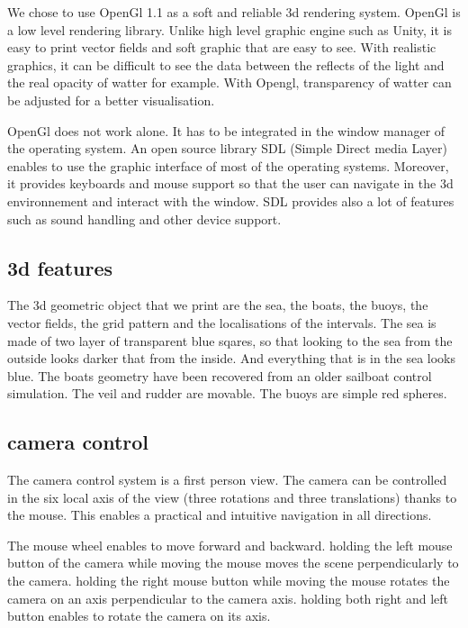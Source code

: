 \documentclass[a4paper]{report}
\begin{document}
We chose to use OpenGl 1.1 as a soft and reliable 3d rendering system. OpenGl is a low level rendering library. Unlike high level graphic engine such as Unity, it is easy to print vector fields and soft graphic that are easy to see. With realistic graphics, it can be difficult to see the data between the reflects of the light and the real opacity of watter for example. With Opengl, transparency of watter can be adjusted for a better visualisation.

OpenGl does not work alone. It has to be integrated in the window manager of the operating system. An open source library SDL (Simple Direct media Layer) enables to use the graphic interface of most of the operating systems. Moreover, it provides keyboards and mouse support so that the user can navigate in the 3d environnement and interact with the window. SDL provides also a lot of features such as sound handling and other device support.
 
\subsection{3d features}

The 3d geometric object that we print are the sea, the boats, the buoys, the vector fields, the grid pattern and the localisations of the intervals. The sea is made of two layer of transparent blue sqares, so that looking to the sea from the outside looks darker that from the inside. And everything that is in the sea looks blue. The boats geometry have been recovered from an older sailboat control simulation. The veil and rudder are movable. The buoys are simple red spheres.


\subsection{camera control}

The camera control system is a first person view. The camera can be controlled in the six local axis of the view (three rotations and three translations) thanks to the mouse. This enables a practical and intuitive navigation in all directions.

The mouse wheel enables to move forward and backward. holding the left mouse button of the camera while moving the mouse moves the scene perpendicularly to the camera. holding the right mouse button while moving the mouse rotates the camera on an axis perpendicular to the camera axis. holding both right and left button enables to rotate the camera on its axis.
\end{document}
